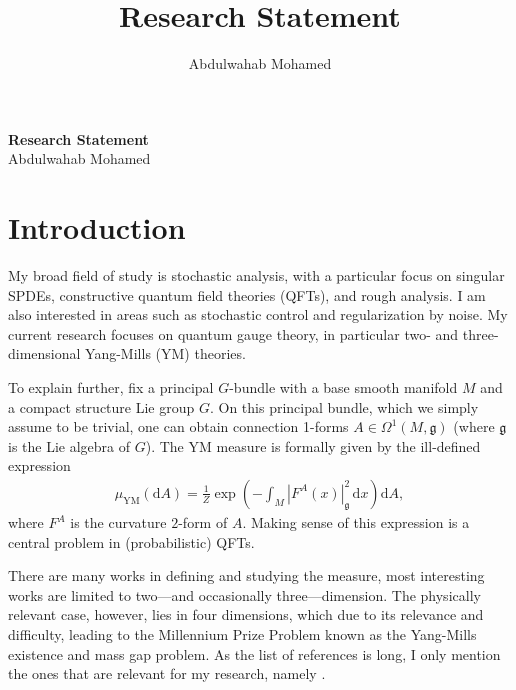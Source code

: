 \documentclass[12pt]{article}
\title{Research Statement}
\author{Abdulwahab Mohamed}
\numberwithin{equation}{section}
\theoremstyle{definition}
\theoremstyle{remark}
\newcommand{\diff}{\mathrm{d}}
\newcommand{\1}{\mathbf 1}
\newcommand{\<}{\langle}
\renewcommand{\>}{\rangle}
\begin{document}
\vspace{-10pt}
\begin{center}
    {\Large \textbf{Research Statement}} \\ \vspace{1pt}
    Abdulwahab Mohamed
\end{center}

\section{Introduction}
My broad field of study is stochastic analysis, with a particular focus on singular SPDEs, constructive quantum field theories (QFTs), and rough analysis. I am also interested in areas such as stochastic control and regularization by noise.
%
My current research focuses on quantum gauge theory, in particular two- and three-dimensional Yang-Mills (YM) theories.
%
%

To explain further, fix a principal $G$-bundle with a base smooth manifold $M$ and a compact structure Lie group $G$. On this principal bundle, which we simply assume to be trivial, one can obtain connection 1-forms $A\in \Omega^1(M,\mathfrak g)$ (where  $\mathfrak g$ is the Lie algebra of $G$).  The YM measure is formally given by the ill-defined expression
\begin{align}\label{eq:YM_measure}
\mu_{\mathrm{YM}}(\diff A)=\frac 1 Z\exp\left(-\int_{M}|F^A(x)|_{\mathfrak g}^2\,\diff x\right)\diff A,
\end{align}
where $F^A$ is the curvature $2$-form of $A$. Making sense of this expression is a central problem in (probabilistic) QFTs. 

There are many works in defining and studying the measure, most interesting works are limited to two—and occasionally three—dimension. The physically relevant case, however, lies in four dimensions, which due to its relevance and difficulty, leading to the Millennium Prize Problem known as the Yang-Mills existence and mass gap problem. As the list of references is long, I only mention the ones that are relevant for my research, namely \cite{Driver89}.  
\end{document}
